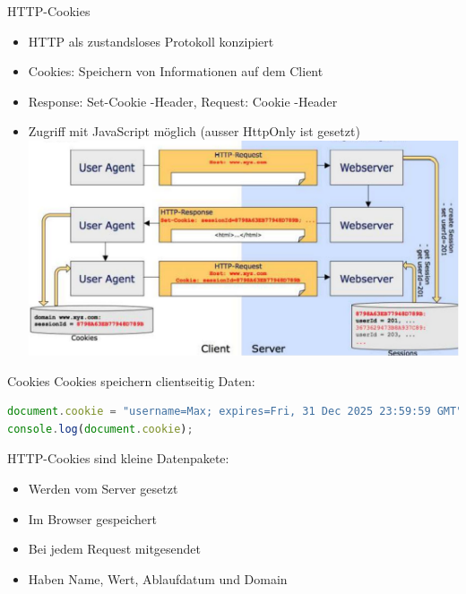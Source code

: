 \begin{definition}{HTTP-Cookies}

\begin{itemize}
\item HTTP als zustandsloses Protokoll konzipiert
\item Cookies: Speichern von Informationen auf dem Client
\item Response: Set-Cookie -Header, Request: Cookie -Header
\item Zugriff mit JavaScript möglich (ausser HttpOnly ist gesetzt)\\
\includegraphics[width=\linewidth]{images/2024_12_29_858f09cde51177c71657g-31(1)}
\end{itemize}
\end{definition}

\begin{definition}{Cookies}
Cookies speichern clientseitig Daten:
\begin{lstlisting}[language=JavaScript, style=basesmol]
document.cookie = "username=Max; expires=Fri, 31 Dec 2025 23:59:59 GMT";
console.log(document.cookie);
\end{lstlisting}
HTTP-Cookies sind kleine Datenpakete:
\begin{itemize}
    \item Werden vom Server gesetzt
    \item Im Browser gespeichert
    \item Bei jedem Request mitgesendet
    \item Haben Name, Wert, Ablaufdatum und Domain
\end{itemize}
\end{definition}


